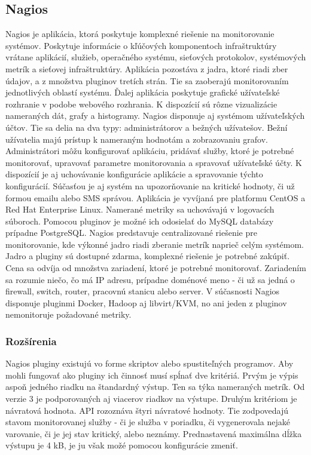 \documentclass[11pt,final,oneside]{fithesis}
\begin{document}
\subsection{Nagios}
Nagios je aplikácia, ktorá poskytuje komplexné riešenie na monitorovanie systémov. Poskytuje informácie o kľúčových komponentoch infraštruktúry vrátane aplikácií, služieb, operačného systému, sieťových protokolov, systémových metrík
a sieťovej infraštruktúry. \cite{19} Aplikácia pozostáva z jadra, ktoré riadi zber údajov, a z množstva pluginov tretích strán. Tie sa zaoberajú monitorovaním jednotlivých oblastí systému. Ďalej aplikácia
poskytuje grafické užívateľské rozhranie v podobe webového rozhrania. K dispozícií sú rôzne vizualizácie nameraných dát, grafy a histogramy. Nagios disponuje aj systémom užívateľských účtov. Tie sa delia na dva typy: 
administrátorov a bežných užívatešov. Bežní užívatelia majú prístup k nameraným hodnotám a zobrazovaniu grafov. Administrátori môžu konfigurovať aplikáciu, pridávať služby, ktoré je potrebné monitorovať,
 upravovať parametre monitorovania a spravovať užívateľské účty. K dispozícií je aj uchovávanie konfigurácie aplikácie a spravovanie týchto konfigurácií. Súčasťou je aj systém na upozorňovanie na kritické
 hodnoty, či už formou emailu alebo SMS správou. Aplikácia je vyvíjaná pre platformu CentOS a Red Hat Enterprise Linux. Namerané metriky sa uchovávajú v logovacích súboroch. 
 Pomocou pluginov je možné ich odosielať do MySQL databázy prípadne PostgreSQL. Nagios predstavuje centralizované riešenie pre  monitorovanie, kde výkonné jadro riadi zberanie metrík naprieč celým systémom. 
 Jadro a pluginy sú dostupné zdarma, komplexné riešenie je potrebné zakúpiť. Cena sa odvíja od množstva zariadení, ktoré je potrebné monitorovať. Zariadením sa rozumie niečo, čo má IP adresu, 
 prípadne doménové meno - či už sa jedná o firewall, switch, router, pracovnú stanicu alebo server. V súčasnosti Nagios disponuje pluginmi Docker, Hadoop aj libvirt/KVM, no ani jeden z pluginov 
 nemonitoruje požadované metriky.

\subsubsection{Rozšírenia}
Nagios pluginy existujú vo forme skriptov alebo spustiteľných programov. Aby mohli fungovať ako pluginy ich činnosť musí spĺnať dve kritériá. Prvým je výpis aspoň jedného riadku na štandardný výstup.
Ten sa týka nameraných metrík. Od verzie 3 je podporovaných aj viacerov riadkov na výstupe. Druhým kritériom je návratová hodnota.
API rozoznáva štyri návratové hodnoty. Tie zodpovedajú stavom monitorovanej služby - či je služba v poriadku, či vygenerovala nejaké varovanie, či je jej stav kritický, alebo neznámy. Prednastavená maximálna dĺžka 
výstupu je 4 kB, je ju však možé pomocou konfigurácie zmeniť.
\end{document}
